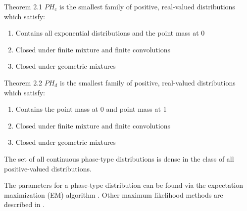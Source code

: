 \begin{theorem}\cite{maier1992} Theorem 2.1
$PH_c$ is the smallest family of positive, real-valued distributions which satisfy:
\begin{enumerate}
    \item Contains all exponential distributions and the point mass at 0
    \item Closed under finite mixture and finite convolutions
    \item Closed under geometric mixtures
\end{enumerate}
\end{theorem}

\begin{theorem}\cite{maier1992} Theorem 2.2
$PH_d$ is the smallest family of positive, real-valued distributions which satisfy:
\begin{enumerate}
    \item Contains the point mass at 0 and point mass at 1
    \item Closed under finite mixture and finite convolutions
    \item Closed under geometric mixtures
\end{enumerate}
\end{theorem}

\begin{theorem} \cite{neuts1981}
The set of all continuous phase-type distributions is dense in the class of all positive-valued distributions.
\end{theorem}

The parameters for a phase-type distribution can be found via the expectation maximization (EM) algorithm \cite{Asmussen1996}.
Other maximum likelihood methods are described in \cite{mle_phase_type2011}.

